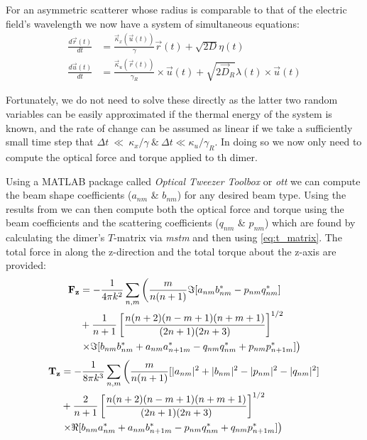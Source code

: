For an asymmetric scatterer whose radius is comparable to that of the 
electric field's wavelength we now have a system of simultaneous equations:
\begin{align}
	\label{eq:full_langevin}
  \frac{{d}\vec{r}(t)}{{dt}}
  &=
    \frac{\vec{\kappa}_x(\vec{u}(t))}{\gamma}\vec{r}(t) + \sqrt{2D}\eta(t)
  \\
  \frac{{d}\vec{u}(t)}{{dt}}
  &=
    \frac{\vec{\kappa}_u(\vec{r}(t))}{\gamma_R}\times \vec{u}(t)
    + \sqrt{2\vec{D}_R}\lambda(t)\times \vec{u}(t)
\end{align}

Fortunately, we do not need to solve these directly as the latter two
random variables can be easily approximated if the thermal energy of
the system is known, and the rate of change can be assumed as linear if
we take a sufficiently small time step that $\Delta t~\ll~\kappa_x/\gamma 
\ \& \ \Delta t \ll \kappa_u/\gamma_R$. In doing so we now only need 
to compute the optical force and torque applied to th dimer. 

Using a  MATLAB package called \textit{Optical Tweezer Toolbox} 
or \textit{ott} \cite{Nieminen2007} we can compute the beam 
shape coefficients ($a_{nm}$ \& $b_{nm}$) for any desired beam 
type. Using the results from \cite{Farsund1996} we can then 
compute both the optical force and torque using the beam 
coefficients and the scattering coefficients ($q_{nm}$ \& $p_{nm}$) 
which are found by calculating the dimer's $T$-matrix via \textit{mstm} \cite{Mackowski2011} and then using \eqref{eq:t_matrix}. The 
total force in along the z-direction and the total torque about 
the z-axis are provided:
\begin{equation}
	\label{eq:optical_force}
\begin{split}
  \bold{F_z}
  &=
    -\frac{1}{4\pi k^2}\sum_{n,m} \left(\frac{m}{n(n+1)}\Im[a_{nm}b^*_{nm}-p_{nm}q^*_{nm}] \right.
  \\ 
  &+\frac{1}{n+1}\left[\frac{n(n+2)(n-m+1)(n+m+1)}{(2n+1)(2n+3)} \right]^{1/2}
  \\
  & \left.\times\Im[b_{nm}b^*_{nm}+a_{nm}a^*_{n+1m}-q_{nm}q^*_{nm}+p_{nm}p^*_{n+1m}] \right)
\end{split}
\end{equation}
\begin{equation}
\begin{split}
  \bold{T_z}
  &=
    -\frac{1}{8\pi k^3}\sum_{n,m} \left(\frac{m}{n(n+1)}[|a_{nm}|^2+|b_{nm}|^2-|p_{nm}|^2-|q_{nm}|^2] \right.
  \\ 
  &+\frac{2}{n+1}\left[\frac{n(n+2)(n-m+1)(n+m+1)}{(2n+1)(2n+3)} \right]^{1/2}
  \\
  & \left.\times\Re[b_{nm}a^*_{nm}+a_{nm}b^*_{n+1m}-p_{nm}q^*_{nm}+q_{nm}p^*_{n+1m}] \right)
\end{split}
\end{equation}


